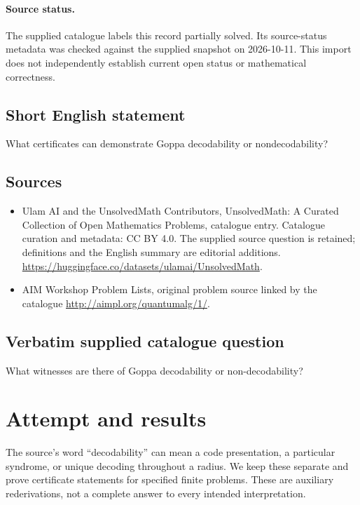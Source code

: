 \documentclass[11pt]{article}
\begin{document}
\paragraph{Source status.}
The supplied catalogue labels this record partially solved. Its source-status metadata was checked against the supplied snapshot on 2026-10-11. This import does not independently establish current open status or mathematical correctness.
\subsection{Short English statement}
What certificates can demonstrate Goppa decodability or nondecodability?
\subsection{Sources}
\begin{itemize}
\item[S1] Ulam AI and the UnsolvedMath Contributors, UnsolvedMath: A Curated Collection of Open Mathematics Problems, catalogue entry. Catalogue curation and metadata: CC BY 4.0. The supplied source question is retained; definitions and the English summary are editorial additions.
\url{https://huggingface.co/datasets/ulamai/UnsolvedMath}.
\item[S2] AIM Workshop Problem Lists, original problem source linked by the catalogue
\url{http://aimpl.org/quantumalg/1/}.
\end{itemize}
\subsection{Verbatim supplied catalogue question}
What witnesses are there of Goppa decodability or non-decodability?

\section{Attempt and results}
The source's word ``decodability'' can mean a code presentation, a particular
syndrome, or unique decoding throughout a radius. We keep these separate and
prove certificate statements for specified finite problems. These are auxiliary
rederivations, not a complete answer to every intended interpretation.
\end{document}
